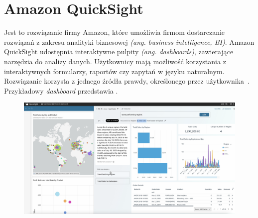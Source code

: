 \section{Amazon QuickSight}
Jest to rozwiązanie firmy Amazon, które umożliwia firmom dostarczanie rozwiązań z zakresu analityki biznesowej \textit{(ang. business intelligence, BI)}. Amazon QuickSight udostępnia interaktywne pulpity \textit{(ang. dashboards)}, zawierające narzędzia do analizy danych. Użytkownicy mają możliwość korzystania z interaktywnych formularzy, raportów czy zapytań w języku naturalnym. Rozwiązanie korzysta z jednego źródła prawdy, określonego przez użytkownika~\cite{AmazonQuickSight}. Przykładowy \textit{dashboard} przedstawia .
\begin{figure}[H]
    \centering
    \includegraphics[width=\textwidth]{images/amazon_qs}
    \label{fig:am-qs}
\end{figure}
\vfill
\clearpage

